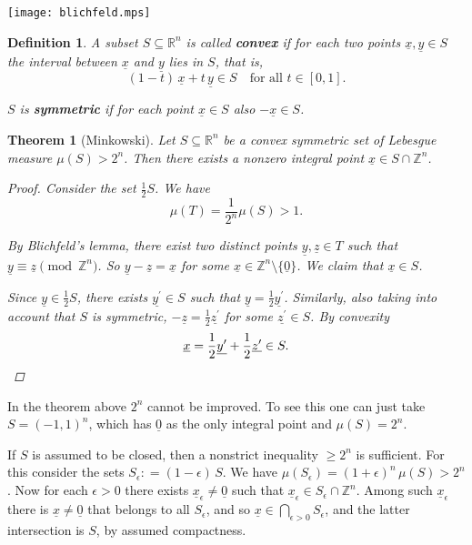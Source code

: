 \documentclass{article}
\newcommand{\term}{\textbf}
\newcommand{\dfn}{\mathrel{\mathop:}=}
\newcommand{\ZZ}{\mathbb{Z}}
\theoremstyle{myplain}
\newtheorem{theorem}[proposition]{Theorem}
\theoremstyle{mydefinition}
\newtheorem{definition}[proposition]{Definition}
\begin{document}
\begin{center}
  \texttt{[image: blichfeld.mps]}
\end{center}

\begin{definition}
  A subset $S \subseteq \mathbb{R}^n$ is called \term{convex} if for each two
  points $\underline{x}, \underline{y} \in S$ the interval between
  $\underline{x}$ and $\underline{y}$ lies in $S$, that is,
  \[ (1-t) \, \underline{x} + t\,\underline{y} \in S \quad \text{for all }t\in [0,1]. \]

  $S$ is \term{symmetric} if for each point $\underline{x} \in S$ also
  $-\underline{x} \in S$.
\end{definition}

\begin{theorem}[Minkowski]
  Let $S \subseteq \mathbb{R}^n$ be a convex symmetric set of Lebesgue measure
  $\mu (S) > 2^n$. Then there exists a nonzero integral point
  $\underline{x} \in S \cap \ZZ^n$.

  \begin{proof}
    Consider the set $\frac{1}{2} S$. We have
    \[ \mu (T) = \frac{1}{2^n} \mu (S) > 1. \]

    By Blichfeld's lemma, there exist two distinct points
    $\underline{y}, \underline{z} \in T$ such that
    $\underline{y} \equiv \underline{z} \pmod{\ZZ^n}$. So
    $\underline{y} - \underline{z} = \underline{x}$ for some
    $\underline{x} \in \ZZ^n\setminus \{ \underline{0} \}$. We claim that
    $\underline{x} \in S$.

    Since $\underline{y} \in \frac{1}{2} S$, there exists
    $\underline{y^\prime} \in S$ such that
    $\underline{y} = \frac{1}{2} \underline{y^\prime}$. Similarly, also taking
    into account that $S$ is symmetric,
    $-\underline{z} = \frac{1}{2} \underline{z^\prime}$ for some
    $\underline{z^\prime} \in S$. By convexity
    \[ \underline{x} = \frac{1}{2} \underline{y^\prime} + \frac{1}{2} \underline{z^\prime} \in S. \qedhere \]
  \end{proof}
\end{theorem}

In the theorem above $2^n$ cannot be improved. To see this one can just take
$S = (-1,1)^n$, which has $\underline{0}$ as the only integral point and
$\mu (S) = 2^n$.

If $S$ is assumed to be closed, then a nonstrict inequality $\ge 2^n$ is
sufficient. For this consider the sets $S_\epsilon \dfn (1-\epsilon) \, S$. We
have $\mu (S_\epsilon) = (1+\epsilon)^n \, \mu (S) > 2^n$. Now for each
$\epsilon > 0$ there exists $\underline{x}_\epsilon \ne \underline{0}$ such that
$\underline{x}_\epsilon \in S_\epsilon \cap \ZZ^n$. Among such
$\underline{x}_\epsilon$ there is $\underline{x} \ne \underline{0}$ that belongs
to all $S_\epsilon$, and so
$\underline{x} \in \bigcap_{\epsilon > 0} S_\epsilon$, and the latter
intersection is $S$, by assumed compactness.
\end{document}

